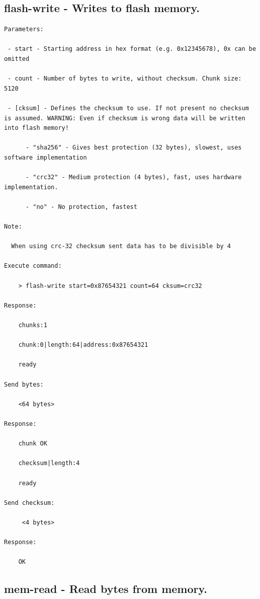 \subsection{flash-write - Writes to flash memory.}
\label{bl_cmd:flash-write}

\begin{lstlisting}
Parameters:

 - start - Starting address in hex format (e.g. 0x12345678), 0x can be omitted
     
 - count - Number of bytes to write, without checksum. Chunk size: 5120
 
 - [cksum] - Defines the checksum to use. If not present no checksum is assumed. WARNING: Even if checksum is wrong data will be written into flash memory!
 
      - "sha256" - Gives best protection (32 bytes), slowest, uses software implementation
           
      - "crc32" - Medium protection (4 bytes), fast, uses hardware implementation.

      - "no" - No protection, fastest

Note:

  When using crc-32 checksum sent data has to be divisible by 4

Execute command: 

    > flash-write start=0x87654321 count=64 cksum=crc32  
    
Response: 

    chunks:1

    chunk:0|length:64|address:0x87654321

    ready
    
Send bytes:

    <64 bytes>
    
Response:

    chunk OK

    checksum|length:4

    ready
 
Send checksum:
     
     <4 bytes>
     
Response:
 
    OK
\end{lstlisting}

\subsection{mem-read - Read bytes from memory.}
\label{bl_cmd:mem-read}

